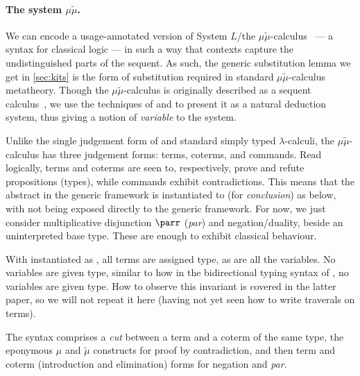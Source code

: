 \paragraph{The system $\mu\tilde\mu$.}
We can encode a usage-annotated version of System $L$/the
$\mu\tilde\mu$-calculus~\cite{CH00} --- a syntax for classical logic --- in
such a way that contexts capture the undistinguished parts of the sequent.
As such, the generic substitution lemma we get in \cref{sec:kits} is the form
of substitution required in standard $\mu\tilde\mu$-calculus metatheory.
Though the $\mu\tilde\mu$-calculus is originally described as a sequent
calculus~\cite{CH00}, we use the techniques of
\citet[p.~12]{herbelin-hab} and \citet{LC06} to present it as a natural
deduction system, thus giving a notion of \emph{variable} to the system.

Unlike the single judgement form of \name{} and standard simply typed
$\lambda$-calculi, the $\mu\tilde\mu$-calculus has three judgement forms:
terms, coterms, and commands.
Read logically, terms and coterms are seen to, respectively, prove and refute
propositions (types), while commands exhibit contradictions.
This means that the abstract  in the generic framework is
instantiated to  (for \emph{conclusion}) as below, with
 not being exposed directly to the generic framework.
For now, we just consider multiplicative disjunction $\parr$ (\emph{par}) and
negation/duality, beside an uninterpreted base type.
These are enough to exhibit classical behaviour.

\noindent
\begin{minipage}[t]{0.5\textwidth}
\end{minipage}
\begin{minipage}[t]{0.5\textwidth}
\end{minipage}

With  instantiated as , all terms are assigned
 type, as are all the variables.
No variables are given  type, similar to how in
the bidirectional typing syntax of \citet[p.~25]{AACMM21}, no variables are
given  type.
How to observe this invariant is covered in the latter paper, so we will not
repeat it here (having not yet seen how to write traverals on terms).

The syntax comprises a \emph{cut} between a term and a coterm of the same type,
the eponymous $\mu$ and $\tilde\mu$ constructs for proof by contradiction, and
then term and coterm (introduction and elimination) forms for negation and
\emph{par}.

